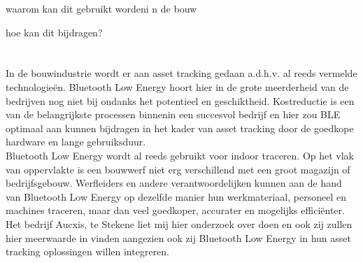 waarom kan dit gebruikt wordeni n de bouw

hoe kan dit bijdragen?






\section{}%
\label{sec:probleemstelling}


In de bouwindustrie wordt er aan asset tracking gedaan a.d.h.v. al reeds vermelde technologieën. Bluetooth Low Energy hoort hier in de grote meerderheid van de bedrijven nog niet bij ondanks het potentieel en geschiktheid. Kostreductie is een van de belangrijkste processen binnenin een succesvol bedrijf en hier zou BLE optimaal aan kunnen bijdragen in het kader van asset tracking door de goedkope hardware en lange gebruiksduur.\\

Bluetooth Low Energy wordt al reeds gebruikt voor indoor traceren. Op het vlak van oppervlakte is een bouwwerf niet erg verschillend met een groot magazijn of bedrijfsgebouw.
Werfleiders en andere verantwoordelijken kunnen aan de hand van Bluetooth Low Energy op dezelfde manier hun werkmateriaal, personeel en machines traceren, maar dan veel goedkoper, accurater en mogelijks efficiënter. \\

Het bedrijf Aucxis, te Stekene liet mij hier onderzoek over doen en ook zij zullen hier meerwaarde in vinden aangezien ook zij Bluetooth Low Energy in hun asset tracking oplossingen willen integreren.

\section{}%
\label{sec:onderzoeksvraag}

